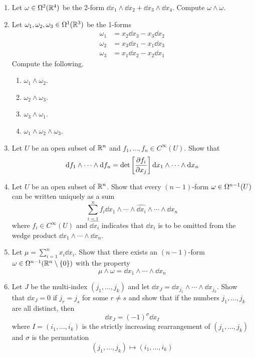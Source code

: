 \documentclass[../psets.tex]{subfiles}
\begin{document}
\begin{enumerate}[label={\textbf{2.3.\roman*.}}]
    \item Let $\omega\in\ome[2]{\R^4}$ be the 2-form $\dd{x_1}\wedge\dd{x_2}+\dd{x_3}\wedge\dd{x_4}$. Compute $\omega\wedge\omega$.
    \item Let $\omega_1,\omega_2,\omega_3\in\ome[1]{\R^3}$ be the 1-forms
    \begin{align*}
        \omega_1 &= x_2\dd{x_3}-x_3\dd{x_2}\\
        \omega_2 &= x_3\dd{x_1}-x_1\dd{x_3}\\
        \omega_3 &= x_1\dd{x_2}-x_2\dd{x_1}
    \end{align*}
    Compute the following.
    \begin{enumerate}
        \item $\omega_1\wedge\omega_2$.
        \item $\omega_2\wedge\omega_3$.
        \item $\omega_3\wedge\omega_1$.
        \item $\omega_1\wedge\omega_2\wedge\omega_3$.
    \end{enumerate}
    \item Let $U$ be an open subset of $\R^n$ and $f_1,\dots,f_n\in C^\infty(U)$. Show that
    \begin{equation*}
        \dd{f_1}\wedge\cdots\wedge\dd{f_n} = \det\left[ \pdv{f_i}{x_j} \right]\dd{x_1}\wedge\cdots\wedge\dd{x_n}
    \end{equation*}
    \item Let $U$ be an open subset of $\R^n$. Show that every $(n-1)$-form $\omega\in\ome[n-1]{U}$ can be written uniquely as a sum
    \begin{equation*}
        \sum_{i=1}^nf_i\dd{x_1}\wedge\cdots\wedge\widehat{\dd{x_i}}\wedge\cdots\wedge\dd{x_n}
    \end{equation*}
    where $f_i\in C^\infty(U)$ and $\widehat{\dd{x_i}}$ indicates that $\dd{x_i}$ is to be omitted from the wedge product $\dd{x_1}\wedge\cdots\wedge\dd{x_n}$.
    \item Let $\mu=\sum_{i=1}^nx_i\dd{x_i}$. Show that there exists an $(n-1)$-form $\omega\in\ome[n-1]{\R^n\setminus\{0\}}$ with the property
    \begin{equation*}
        \mu\wedge\omega = \dd{x_1}\wedge\cdots\wedge\dd{x_n}
    \end{equation*}
    \item Let $J$ be the multi-index $(j_1,\dots,j_k)$ and let $\dd{x_J}=\dd{x_{j_1}}\wedge\cdots\wedge\dd{x_{j_k}}$. Show that $\dd{x_J}=0$ if $j_r=j_s$ for some $r\neq s$ and show that if the numbers $j_1,\dots,j_k$ are all distinct, then
    \begin{equation*}
        \dd{x_J} = (-1)^\sigma\dd{x_I}
    \end{equation*}
    where $I=(i_1,\dots,i_k)$ is the strictly increasing rearrangement of $(j_1,\dots,j_k)$ and $\sigma$ is the permutation
    \begin{equation*}
        (j_1,\dots,j_k) \mapsto (i_1,\dots,i_k)
    \end{equation*}
\end{enumerate}
\end{document}

